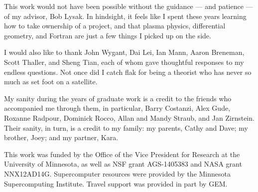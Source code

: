 
This work would not have been possible without the guidance --- and patience
--- of my advisor, Bob Lysak. In hindsight, it feels like I spent these years
learning how to take ownership of a project, and that plasma physics,
differential geometry, and Fortran are just a few things I picked up on the
side. 

I would also like to thank John Wygant, Dai Lei, Ian Mann, Aaron Breneman,
Scott Thaller, and Sheng Tian, each of whom gave thoughtful responses to my
endless questions. Not once did I catch flak for being a theorist who has
never so much as set foot on a satellite. 

My sanity during the years of graduate work is a credit to the friends who
accompanied me through them, in particular, Barry Costanzi, Alex Gude, Roxanne
Radpour,
Dominick Rocco, Allan and Mandy Straub, and Jan Zirnstein. Their sanity, in
turn, is a credit to my family: my parents, Cathy and Dave; my brother, Joey;
and my partner, Kara. 

\vfill

This work was funded by the Office of the Vice President for Research at the
University of Minnesota, as well as NSF grant AGS-1405383 and NASA grant
NNX12AD14G. Supercomputer resources were provided by the Minnesota Supercomputing
Institute. Travel support was provided in part by GEM. 

















